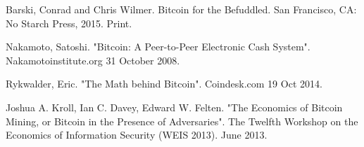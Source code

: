 \documentclass{article}
\begin{document}
\begin{thebibliography}{99}

Barski, Conrad and Chris Wilmer.
\newblock Bitcoin for the Befuddled.
\newblock San Francisco, CA: No Starch Press, 2015. Print.

Nakamoto, Satoshi.
\newblock "Bitcoin: A Peer-to-Peer Electronic Cash System". 
\newblock Nakamotoinstitute.org 31 October 2008.

Rykwalder, Eric.
\newblock "The Math behind Bitcoin". 
\newblock Coindesk.com 19 Oct 2014.

Joshua A. Kroll, Ian C. Davey, Edward W. Felten.
\newblock "The Economics of Bitcoin Mining, or Bitcoin in the Presence of Adversaries".
\newblock The Twelfth Workshop on the Economics of Information Security (WEIS 2013). June 2013.
 
\end{thebibliography}

\end{document}
